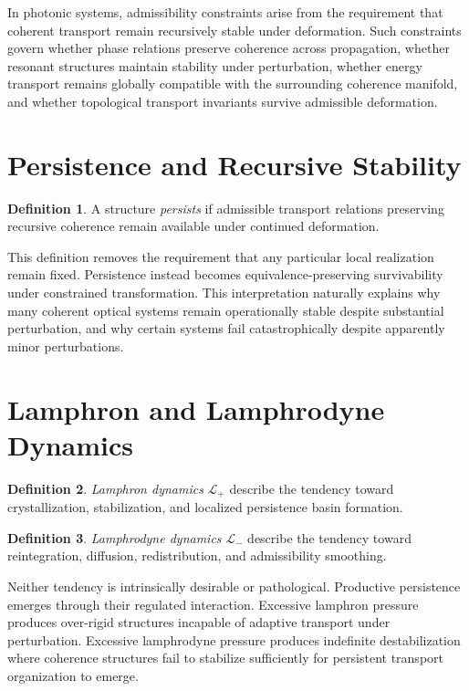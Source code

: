 \documentclass[11pt,openany]{book}
\theoremstyle{definition}
\newtheorem{definition}{Definition}[chapter]
\theoremstyle{plain}
\newcommand{\lamphron}{\mathcal{L}_{+}}
\newcommand{\lamphrodyne}{\mathcal{L}_{-}}
\begin{document}
In photonic systems, admissibility constraints arise from the requirement that coherent transport remain recursively stable under deformation. Such constraints govern whether phase relations preserve coherence across propagation, whether resonant structures maintain stability under perturbation, whether energy transport remains globally compatible with the surrounding coherence manifold, and whether topological transport invariants survive admissible deformation.

\section{Persistence and Recursive Stability}

\begin{definition}
A structure \emph{persists} if admissible transport relations preserving recursive coherence remain available under continued deformation.
\end{definition}

This definition removes the requirement that any particular local realization remain fixed. Persistence instead becomes equivalence-preserving survivability under constrained transformation. This interpretation naturally explains why many coherent optical systems remain operationally stable despite substantial perturbation, and why certain systems fail catastrophically despite apparently minor perturbations.

\section{Lamphron and Lamphrodyne Dynamics}

\begin{definition}
\emph{Lamphron dynamics} $\lamphron$ describe the tendency toward crystallization, stabilization, and localized persistence basin formation.
\end{definition}

\begin{definition}
\emph{Lamphrodyne dynamics} $\lamphrodyne$ describe the tendency toward reintegration, diffusion, redistribution, and admissibility smoothing.
\end{definition}

Neither tendency is intrinsically desirable or pathological. Productive persistence emerges through their regulated interaction. Excessive lamphron pressure produces over-rigid structures incapable of adaptive transport under perturbation. Excessive lamphrodyne pressure produces indefinite destabilization where coherence structures fail to stabilize sufficiently for persistent transport organization to emerge.
\end{document}
